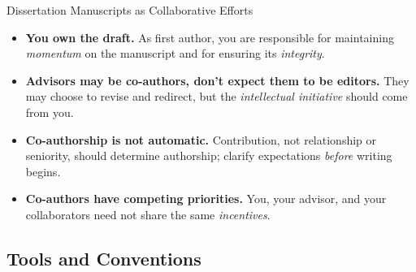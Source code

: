 \documentclass{beamer}
\begin{document}
\begin{frame}{Dissertation Manuscripts as Collaborative Efforts}

  \footnotesize
  \begin{itemize}
    \item \textbf{You own the draft.} 
        As first author, you are responsible for maintaining \emph{momentum} on the manuscript and for ensuring its \emph{integrity}.
    \item \textbf{Advisors may be co-authors, don't expect them to be editors.}
        They may choose to revise and redirect, but the \emph{intellectual initiative} should come from you.
    \item \textbf{Co-authorship is not automatic.} Contribution, not
        relationship or seniority, should determine authorship; clarify
        expectations \emph{before} writing begins.
    \item \textbf{Co-authors have competing priorities.} 
        You, your advisor, and your collaborators need not share the same \emph{incentives}.
  \end{itemize}

\end{frame}




\subsection{Tools and Conventions}
\end{document}
